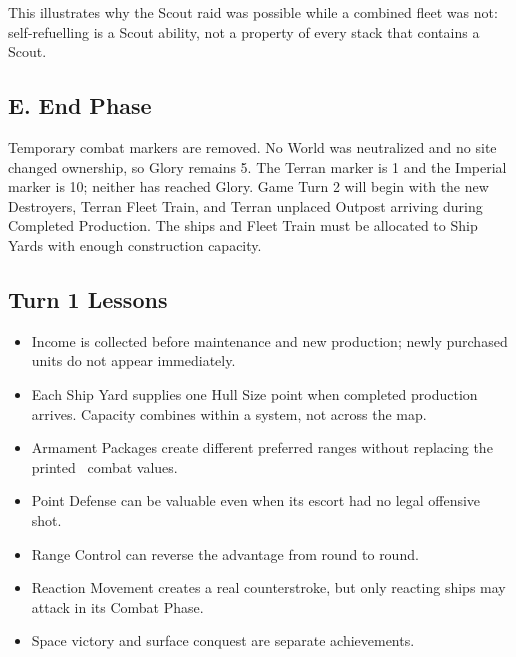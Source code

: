 This illustrates why the Scout raid was possible while a combined fleet was
not: self-refuelling is a Scout ability, not a property of every stack that
contains a Scout.

\subsection{E. End Phase}

Temporary combat markers are removed. No World was neutralized and no site
changed ownership, so Glory remains 5. The Terran marker is 1 and the Imperial
marker is 10; neither has reached Glory. Game Turn 2 will begin with the new
Destroyers, Terran Fleet Train, and Terran unplaced Outpost arriving during
Completed Production. The ships and Fleet Train must be allocated to Ship
Yards with enough construction capacity.

\subsection{Turn 1 Lessons}

\begin{itemize}
  \item Income is collected before maintenance and new production; newly
    purchased units do not appear immediately.
  \item Each Ship Yard supplies one Hull Size point when completed production
    arrives. Capacity combines within a system, not across the map.
  \item Armament Packages create different preferred ranges without replacing
    the printed \SpaceEmpires\ combat values.
  \item Point Defense can be valuable even when its escort had no legal
    offensive shot.
  \item Range Control can reverse the advantage from round to round.
  \item Reaction Movement creates a real counterstroke, but only reacting
    ships may attack in its Combat Phase.
  \item Space victory and surface conquest are separate achievements.
\end{itemize}
